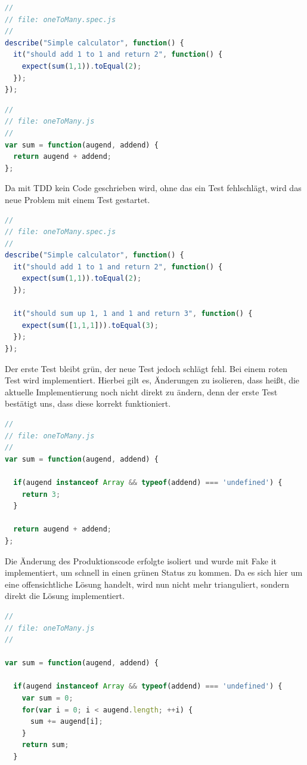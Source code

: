 {\begin{lstlisting}[language=JavaScript]
//
// file: oneToMany.spec.js
//
describe("Simple calculator", function() {
  it("should add 1 to 1 and return 2", function() {
    expect(sum(1,1)).toEqual(2);
  });
});
\end{lstlisting}
\begin{lstlisting}[language=JavaScript]
//
// file: oneToMany.js
//
var sum = function(augend, addend) {
  return augend + addend;
};
\end{lstlisting}

Da mit TDD kein Code geschrieben wird, ohne das ein Test fehlschlägt, wird das neue Problem mit einem Test gestartet.

\begin{lstlisting}[language=JavaScript]
//
// file: oneToMany.spec.js
//
describe("Simple calculator", function() {
  it("should add 1 to 1 and return 2", function() {
    expect(sum(1,1)).toEqual(2);
  });

  it("should sum up 1, 1 and 1 and return 3", function() {
    expect(sum([1,1,1])).toEqual(3);
  });
});

\end{lstlisting}

Der erste Test bleibt grün, der neue Test jedoch schlägt fehl. Bei einem roten Test wird implementiert. Hierbei gilt es, Änderungen zu isolieren, dass heißt, die aktuelle Implementierung noch nicht direkt zu ändern, denn der erste Test bestätigt uns, dass diese korrekt funktioniert.

\begin{lstlisting}[language=JavaScript]
//
// file: oneToMany.js
//
var sum = function(augend, addend) {

  if(augend instanceof Array && typeof(addend) === 'undefined') {
    return 3;
  }

  return augend + addend;
};
\end{lstlisting}

Die Änderung des Produktionscode erfolgte isoliert und wurde mit Fake it implementiert, um schnell in einen grünen Status zu kommen. Da es sich hier um eine offensichtliche Lösung handelt, wird nun nicht mehr trianguliert, sondern direkt die Lösung implementiert.

\begin{lstlisting}[language=JavaScript]
//
// file: oneToMany.js
//

var sum = function(augend, addend) {

  if(augend instanceof Array && typeof(addend) === 'undefined') {
    var sum = 0;
    for(var i = 0; i < augend.length; ++i) {
      sum += augend[i];
    }
    return sum;
  }


\end{lstlisting}}
